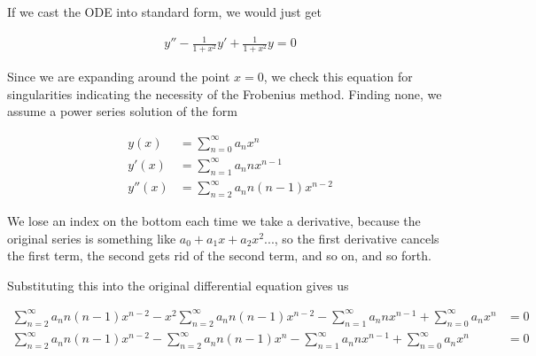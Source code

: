 \documentclass[paper=a4, fontsize=11pt]{scrartcl} %
\numberwithin{equation}{section} %
\numberwithin{figure}{section} %
\numberwithin{table}{section} %
\begin{document}
If we cast the ODE into standard form, we would just get 

\begin{align}
y'' - \frac{1}{1 + x^2} y' + \frac{1}{1+x^2}y = 0
\end{align}

Since we are expanding around the point $x=0$, we check this equation for singularities indicating the necessity of the Frobenius method. Finding none, we assume a power series solution of the form

\begin{align}
y(x) &= \sum_{n=0}^{\infty} a_n x^n \\
y'(x) &= \sum_{n=1}^{\infty} a_n n x^{n-1} \\
y''(x) &= \sum_{n=2}^{\infty} a_n n(n-1) x^{n-2}
\end{align} 

We lose an index on the bottom each time we take a derivative, because the original series is something like $a_0 + a_1 x + a_2 x^2 ...$, so the first derivative cancels the first term, the second gets rid of the second term, and so on, and so forth. 

\hspace{2mm}

Substituting this into the original differential equation gives us

\begin{align}
\sum_{n=2}^{\infty} a_n n(n-1) x^{n-2} - x^2 \sum_{n=2}^{\infty} a_n n(n-1) x^{n-2} - \sum_{n=1}^{\infty} a_n n x^{n-1} + \sum_{n=0}^{\infty} a_n x^n &= 0\\
\sum_{n=2}^{\infty} a_n n(n-1) x^{n-2} - \sum_{n=2}^{\infty} a_n n(n-1) x^{n} - \sum_{n=1}^{\infty} a_n n x^{n-1} + \sum_{n=0}^{\infty} a_n x^n &= 0\\
\end{align}




\end{document}
